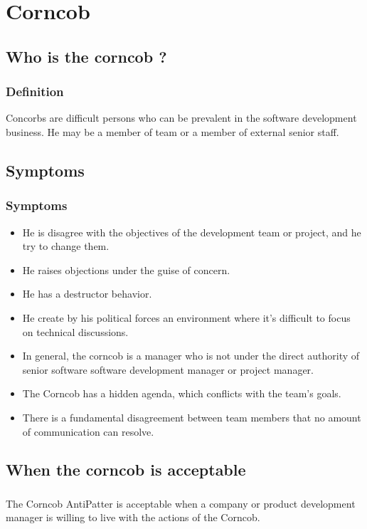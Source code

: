 \documentclass{beamer}
\begin{document}
\section{Corncob}
\subsection{Who is the corncob ?}
\begin{frame}
\frametitle{Definition}
Concorbs are difficult persons who can be prevalent in the software development business. He may be a member of team or a member of external senior staff.


\end{frame}

\subsection{Symptoms}
\begin{frame}
\frametitle{Symptoms}
\begin{itemize}
\item He is disagree with the objectives of the development team or project, and he try to change them.
\item He raises objections under the guise of concern.
\item He has a destructor behavior.
\item He create by his political forces an environment where it's difficult to focus on technical discussions.
\item In general, the corncob is a manager who is not under the direct authority of senior software software development manager or project manager.
\item The Corncob has a hidden agenda, which conflicts with the team's goals.
\item There is a fundamental disagreement between team members that no amount of communication can resolve.
\end{itemize}
\end{frame}

\subsection{When the corncob is acceptable}
\begin{frame}
\frametitle{}
The Corncob AntiPatter is acceptable when a company or product development manager is willing to live with the actions of the Corncob.
\end{frame}
\end{document}

